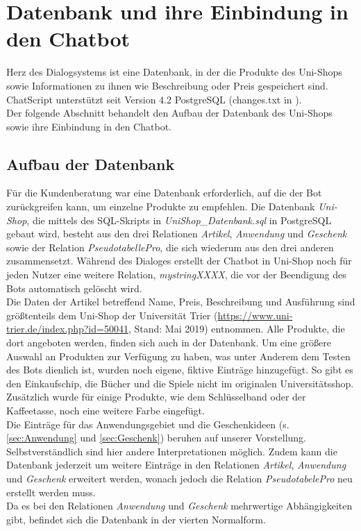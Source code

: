 \chapter{Datenbank und ihre Einbindung in den Chatbot}
\label{sec:DBuEinbindung}

Herz des Dialogsystems ist eine Datenbank, in der die Produkte des Uni-Shops sowie Informationen zu ihnen wie Beschreibung oder Preis gespeichert sind. ChatScript unterstützt seit Version 4.2 PostgreSQL (changes.txt in \citet{chatscript2019}).\\
Der folgende Abschnitt behandelt den Aufbau der Datenbank des Uni-Shops sowie ihre Einbindung in den Chatbot.\\


\section{Aufbau der Datenbank}
\label{sec:DB}

Für die Kundenberatung war eine Datenbank erforderlich, auf die der Bot zurückgreifen kann, um einzelne Produkte zu empfehlen. Die Datenbank \textit{Uni-Shop}, die mittels des SQL-Skripts in \textit {UniShop\_Datenbank.sql} in PostgreSQL gebaut wird, besteht aus den drei Relationen \textit{Artikel}, \textit{Anwendung} und \textit{Geschenk} sowie der Relation \textit{PseudotabellePro}, die sich wiederum aus den drei anderen zusammensetzt. Während des Dialoges erstellt der Chatbot in Uni-Shop noch für jeden Nutzer eine weitere Relation, \textit{mystringXXXX}, die vor der Beendigung des Bots automatisch gelöscht wird.\\
Die Daten der Artikel betreffend Name, Preis, Beschreibung und Ausführung sind größtenteils dem Uni-Shop der Universität Trier (\url{https://www.uni-trier.de/index.php?id=50041}, Stand: Mai 2019) entnommen. Alle Produkte, die dort angeboten werden, finden sich auch in der Datenbank. Um eine größere Auswahl an Produkten zur Verfügung zu haben, was unter Anderem dem Testen des Bots dienlich ist, wurden noch eigene, fiktive Einträge hinzugefügt. So gibt es den Einkaufschip, die Bücher und die Spiele nicht im originalen Universitätsshop. Zusätzlich wurde für einige Produkte, wie dem Schlüsselband oder der Kaffeetasse, noch eine weitere Farbe eingefügt.\\
Die Einträge für das Anwendungsgebiet und die Geschenkideen (s. \ref{sec:Anwendung} und \ref{sec:Geschenk}) beruhen auf unserer Vorstellung. Selbstverständlich sind hier andere Interpretationen möglich. Zudem kann die Datenbank jederzeit um weitere Einträge in den Relationen \textit{Artikel}, \textit{Anwendung} und \textit{Geschenk} erweitert werden, wonach jedoch die Relation \textit{PseudotabelePro} neu erstellt werden muss.\\
Da es bei den Relationen \textit{Anwendung} und \textit{Geschenk} mehrwertige Abhängigkeiten gibt, befindet sich die Datenbank in der vierten Normalform.\\


